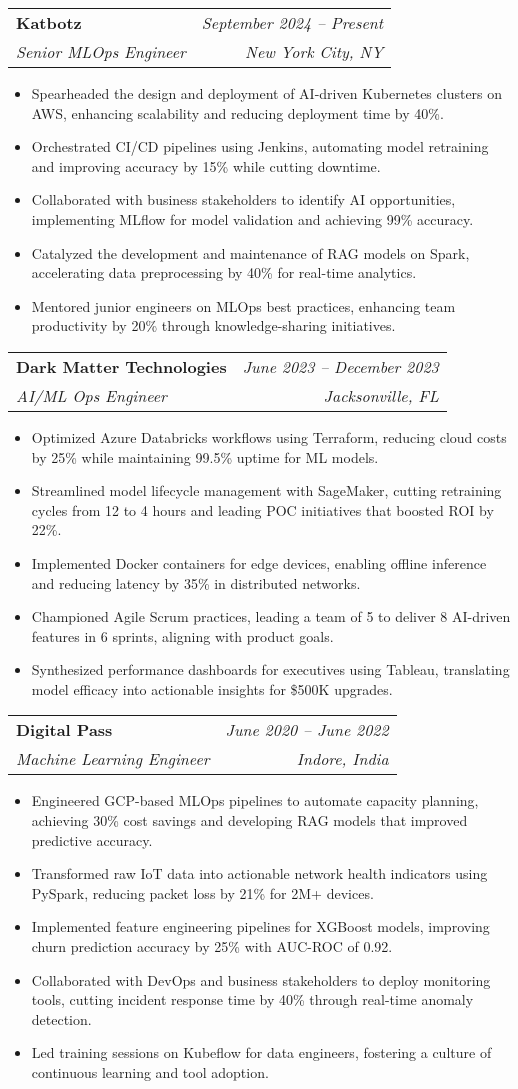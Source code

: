 \documentclass[letterpaper,10pt]{article}
\makeatletter
\newcommand{\resumeItem}[1]{
  \item\small{
    {#1 \vspace{-1.5pt}}
  }
}
\newcommand{\resumeSubheading}[4]{
  \vspace{-2pt}\item
    \begin{tabular*}{0.97\textwidth}[t]{l@{\extracolsep{\fill}}r}
      \textbf{#1} & #2 \\
      \textit{\small#3} & \textit{\small #4} \\
    \end{tabular*}\vspace{-5pt}
}
\newcommand{\resumeItemListStart}{\begin{itemize}[leftmargin=0.15in]}
\newcommand{\resumeItemListEnd}{\end{itemize}\vspace{-5pt}}
\makeatother
\begin{document}
\resumeSubheading
{Katbotz}{\textit{September 2024 -- Present}}
{Senior MLOps Engineer}{New York City, NY}
\resumeItemListStart
    \resumeItem{Spearheaded the design and deployment of AI-driven Kubernetes clusters on AWS, enhancing scalability and reducing deployment time by 40\%.}
    \resumeItem{Orchestrated CI/CD pipelines using Jenkins, automating model retraining and improving accuracy by 15\% while cutting downtime.}
    \resumeItem{Collaborated with business stakeholders to identify AI opportunities, implementing MLflow for model validation and achieving 99\% accuracy.}
    \resumeItem{Catalyzed the development and maintenance of RAG models on Spark, accelerating data preprocessing by 40\% for real-time analytics.}
    \resumeItem{Mentored junior engineers on MLOps best practices, enhancing team productivity by 20\% through knowledge-sharing initiatives.}
\resumeItemListEnd

\resumeSubheading
{Dark Matter Technologies}{\textit{June 2023 -- December 2023}}
{AI/ML Ops Engineer}{Jacksonville, FL}
\resumeItemListStart
    \resumeItem{Optimized Azure Databricks workflows using Terraform, reducing cloud costs by 25\% while maintaining 99.5\% uptime for ML models.}
    \resumeItem{Streamlined model lifecycle management with SageMaker, cutting retraining cycles from 12 to 4 hours and leading POC initiatives that boosted ROI by 22\%.}
    \resumeItem{Implemented Docker containers for edge devices, enabling offline inference and reducing latency by 35\% in distributed networks.}
    \resumeItem{Championed Agile Scrum practices, leading a team of 5 to deliver 8 AI-driven features in 6 sprints, aligning with product goals.}
    \resumeItem{Synthesized performance dashboards for executives using Tableau, translating model efficacy into actionable insights for \$500K upgrades.}
\resumeItemListEnd

\resumeSubheading
{Digital Pass}{\textit{June 2020 -- June 2022}}
{Machine Learning Engineer}{Indore, India}
\resumeItemListStart
    \resumeItem{Engineered GCP-based MLOps pipelines to automate capacity planning, achieving 30\% cost savings and developing RAG models that improved predictive accuracy.}
    \resumeItem{Transformed raw IoT data into actionable network health indicators using PySpark, reducing packet loss by 21\% for 2M+ devices.}
    \resumeItem{Implemented feature engineering pipelines for XGBoost models, improving churn prediction accuracy by 25\% with AUC-ROC of 0.92.}
    \resumeItem{Collaborated with DevOps and business stakeholders to deploy monitoring tools, cutting incident response time by 40\% through real-time anomaly detection.}
    \resumeItem{Led training sessions on Kubeflow for data engineers, fostering a culture of continuous learning and tool adoption.}
\resumeItemListEnd
\end{document}
